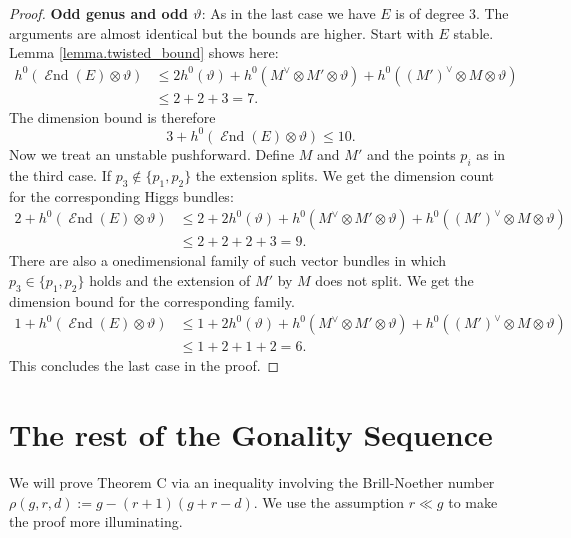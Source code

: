 \documentclass[12pt]{extarticle}
\theoremstyle{definition}
\numberwithin{theorem}{section}
\DeclareMathOperator{\End}{\mathcal{E}nd}
\begin{document}
\begin{proof}
\textbf{Odd genus and odd $\vartheta$}:
As in the last case we have $E$ is of degree $3$. The arguments are almost identical but the bounds are higher. Start with $E$ stable. Lemma \ref{lemma.twisted_bound} shows here:
\begin{align*}
h^0(\End(E) \otimes \vartheta) &\leq 2h^0(\vartheta) + h^0(M^\vee \otimes M' \otimes \vartheta) + h^0((M')^\vee \otimes M \otimes \vartheta) \\
&\leq 2 + 2 + 3=7.
\end{align*}
The dimension bound is therefore 
\begin{equation*}
3 + h^0(\End(E)\otimes \vartheta) \leq 10.
\end{equation*}
Now we treat an unstable pushforward. Define $M$ and $M'$ and the points $p_i$ as in the third case. If $p_3 \notin \{p_1,p_2\}$ the extension splits. We get the dimension count for the corresponding Higgs bundles:
\begin{align*}
2 + h^0(\End(E) \otimes \vartheta) &\leq 2 + 2h^0(\vartheta) +h^0(M^\vee \otimes M'\otimes \vartheta) + h^0((M')^\vee\otimes M \otimes \vartheta)\\ &\leq 2 + 2 + 2 +3= 9.
\end{align*}
There are also a onedimensional family of such vector bundles in which $p_3 \in \{p_1,p_2\}$ holds and the extension of $M'$ by $M$ does not split. We get the dimension bound for the corresponding family.
\begin{align*}
1 + h^0(\End(E) \otimes \vartheta) &\leq 1 + 2h^0(\vartheta) +h^0(M^\vee \otimes M'\otimes \vartheta) + h^0((M')^\vee\otimes M \otimes \vartheta) \\
&\leq 1 + 2 + 1 + 2 = 6.
\end{align*}
This concludes the last case in the proof.
\end{proof}
\section{The rest of the Gonality Sequence}\label{section:gon_seq}
We will prove Theorem C via an inequality involving the Brill-Noether number $\rho(g,r,d) := g -(r+1)(g+r-d)$. We use the assumption $r \ll g$ to make the proof more illuminating.  
\end{document}
